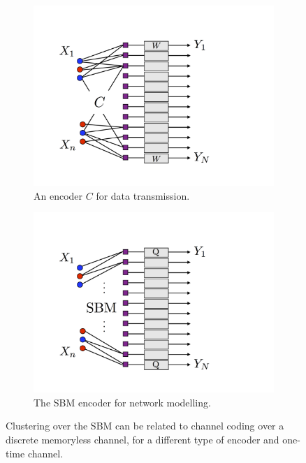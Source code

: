 \documentclass[11pt]{article}
\newcommand{\1}{\mathbb{1}}
\begin{document}
\begin{figure}[h]
\centering
\begin{subfigure}{.5\textwidth}
  \centering
  \includegraphics[width=1\linewidth]{ldpc_clustering1.png}
  \caption{An encoder $C$ for data transmission.}
  \label{fig-c}
\end{subfigure}%
\begin{subfigure}{.5\textwidth}
  \centering
  \includegraphics[width=1\linewidth]{ldpc_clustering2.png}
  \caption{The SBM encoder for network modelling.}
  \label{fig-sbm}
\end{subfigure}
\caption{Clustering over the SBM can be related to channel coding over a discrete memoryless channel, for a different type of encoder and one-time channel.}
\label{double-fig}
\end{figure}
\end{document}
